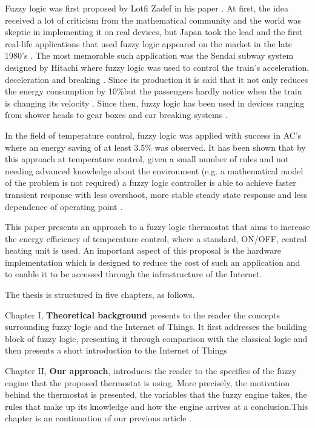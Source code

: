 Fuzzy logic was first proposed by Lotfi Zadef in his paper  \cite{FuzzySets}. At first, the
idea received a lot of criticism from the mathematical community and the world was skeptic in implementing it
on real devices, but Japan took the lead and the first real-life applications that used fuzzy logic appeared on
the market in the late 1980's \cite{zadeh1996fuzzy}. The most memorable such application was the Sendai subway
system designed by Hitachi where fuzzy logic was used to control the train's acceleration, deceleration and
breaking \cite{zadeh1996fuzzy}. Since its production it is said that it not only reduces the energy
consumption by 10\%but the passengers hardly notice when the train is changing its velocity
\cite{FuzzyLogicMassUse}. Since then, fuzzy logic has been used in devices ranging from shower heads
\cite{zadeh1996fuzzy} to gear boxes and car breaking systems \cite{FuzzyAutomotive}.

In the field of temperature control, fuzzy logic was applied with success in AC's \cite{FuzzyAppliences} where
an energy saving of at least 3.5\% was observed. It has been shown that by this approach at temperature
control, given a small number of rules and not needing advanced knowledge about the environment (e.g. a
mathematical model of the problem is not required) a fuzzy logic controller is able to achieve faster transient
response with less overshoot, more stable steady state response and less dependence of operating point
\cite{FuzzyTempControl}.

This paper presents an approach to a fuzzy logic thermostat that aims to increase the energy efficiency
of temperature control, where a standard, ON/OFF, central heating unit is used. An important aspect of this
proposal is the hardware implementation which is designed to reduce the cost of such an application and to
enable it to be accessed through the infrastructure of the Internet.

\qquad The thesis is structured in five chapters, as follows. \par
\qquad Chapter I, \textbf{Theoretical background} presents to the reader the concepts surrounding fuzzy logic
and the Internet of Things. It first addresses the building block of fuzzy logic, presenting it through
comparison with the classical logic and then presents a short introduction to the Internet of Things

\qquad Chapter II, \textbf{Our approach}, introduces the reader to the specifics of the fuzzy engine
that the proposed thermostat is using. More precisely, the motivation behind the thermostat is presented, the
variables that the fuzzy engine takes, the rules that make up its knowledge and how the engine arrives at a
conclusion.This chapter is an continuation of our previous article \cite{FuzzyLogicIOT}.

